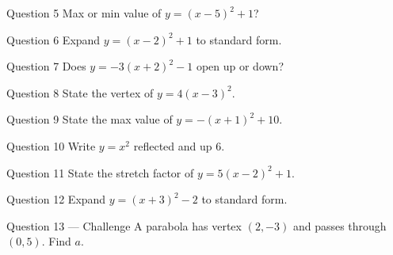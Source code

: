\documentclass[11pt]{article}
\begin{document}
\begin{qbox}{Question 5}
Max or min value of $y=(x-5)^2+1$?\workspace{2.4cm}
\end{qbox}

\begin{qbox}{Question 6}
Expand $y=(x-2)^2+1$ to standard form.\workspace{2.4cm}
\end{qbox}

\begin{qbox}{Question 7}
Does $y=-3(x+2)^2-1$ open up or down?\workspace{2.4cm}
\end{qbox}

\begin{qbox}{Question 8}
State the vertex of $y=4(x-3)^2$.\workspace{2.4cm}
\end{qbox}

\begin{qbox}{Question 9}
State the max value of $y=-(x+1)^2+10$.\workspace{2.4cm}
\end{qbox}

\begin{qbox}{Question 10}
Write $y=x^2$ reflected and up 6.\workspace{2.4cm}
\end{qbox}

\begin{qbox}{Question 11}
State the stretch factor of $y=5(x-2)^2+1$.\workspace{2.4cm}
\end{qbox}

\begin{qbox}{Question 12}
Expand $y=(x+3)^2-2$ to standard form.\workspace{2.4cm}
\end{qbox}

\begin{qbox}{Question 13 --- Challenge}
A parabola has vertex $(2,-3)$ and passes through $(0,5)$. Find $a$.\workspace{3cm}
\end{qbox}

\clearpage
{}
\end{document}
